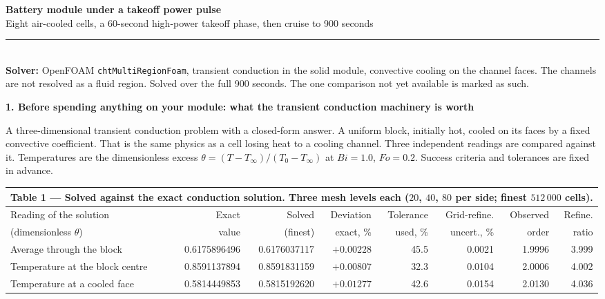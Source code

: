 \documentclass[9pt,a4paper]{article}
\renewcommand{\footnotesize}{\fontsize{6.9}{7.5}\selectfont}
\begin{document}
\fontsize{7.8}{8.7}\selectfont
\enlargethispage{26pt}

{\fontsize{13.5}{15}\selectfont\bfseries Battery module under a takeoff power pulse}\\[1pt]
{\fontsize{8.6}{9.8}\selectfont Eight air-cooled cells, a 60-second high-power
takeoff phase, then cruise to 900 seconds}\\[2pt]
{\color{rulegrey}\rule{\textwidth}{0.9pt}}\\[1pt]
{\footnotesize\textbf{Solver:} OpenFOAM \texttt{chtMultiRegionFoam}, transient
conduction in the solid module, convective cooling on the channel faces.
The channels are not resolved as a fluid region. Solved over the full 900
seconds. The one comparison not yet available is marked as such.}

\vspace{1pt}
\textbf{1. Before spending anything on your module: what the transient
conduction machinery is worth}

\vspace{0.5pt}
{\footnotesize A three-dimensional transient conduction problem with a
closed-form answer. A uniform block, initially hot, cooled on its faces by a
fixed convective coefficient. That is the same physics as a cell losing heat to
a cooling channel. Three independent readings are compared against it.
Temperatures are the dimensionless excess
$\theta = (T-T_{\infty})/(T_{0}-T_{\infty})$ at $Bi = 1.0$, $Fo = 0.2$. Success
criteria and tolerances are fixed in advance.}

\vspace{1.5pt}
{\fontsize{6.7}{7.7}\selectfont
\begin{tabular}{l rr r r r r r}
\multicolumn{8}{l}{\textbf{Table 1 --- Solved against the exact conduction solution.} Three mesh levels each ($20$, $40$, $80$ per side; finest $512\,000$ cells).}\\
\toprule
Reading of the solution & Exact & Solved & Deviation & Tolerance & Grid-refine. & Observed & Refine. \\
(dimensionless $\theta$) & value & (finest) & exact, \% & used, \% & uncert., \% & order & ratio \\
\midrule
Average through the block        & 0.6175896496 & 0.6176037117 & $+0.00228$ & 45.5 & 0.0021 & 1.9996 & 3.999 \\
Temperature at the block centre  & 0.8591137894 & 0.8591831159 & $+0.00807$ & 32.3 & 0.0104 & 2.0006 & 4.002 \\
Temperature at a cooled face     & 0.5814449853 & 0.5815192620 & $+0.01277$ & 42.6 & 0.0154 & 2.0130 & 4.036 \\
\bottomrule
\end{tabular}}
\end{document}
